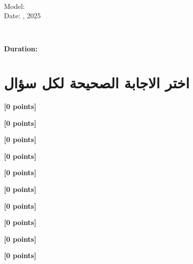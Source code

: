 \documentclass[12pt]{article}
\begin{document}
\begin{flushright}
{\Large \textbf{}}\\[0.25em]
{\normalsize \textenglish{Model: }}\\[0.1em]
{\normalsize \textenglish{Date: }{, 2025}}
\end{flushright}

\vspace{0.6cm}

\noindent
\begin{minipage}[t]{0.65\textwidth}
  \raggedright
  \textbf{}\\[0.3em]
\end{minipage}\hfill
\begin{minipage}[t]{0.3\textwidth}
  \raggedleft
  \textenglish{\textbf{Duration: }}
\end{minipage}

\vspace{0.9cm}

\section*{اختر الاجابة الصحيحة لكل سؤال}

\noindent 

\hfill \textbf{[0 points]}\vspace{0.6em}

\noindent 

\hfill \textbf{[0 points]}\vspace{0.6em}

\noindent 

\hfill \textbf{[0 points]}\vspace{0.6em}

\noindent 

\hfill \textbf{[0 points]}\vspace{0.6em}

\noindent 

\hfill \textbf{[0 points]}\vspace{0.6em}

\noindent 

\hfill \textbf{[0 points]}\vspace{0.6em}

\noindent 

\hfill \textbf{[0 points]}\vspace{0.6em}

\noindent 

\hfill \textbf{[0 points]}\vspace{0.6em}

\noindent 

\hfill \textbf{[0 points]}\vspace{0.6em}

\noindent 

\hfill \textbf{[0 points]}\vspace{0.6em}
\end{document}

